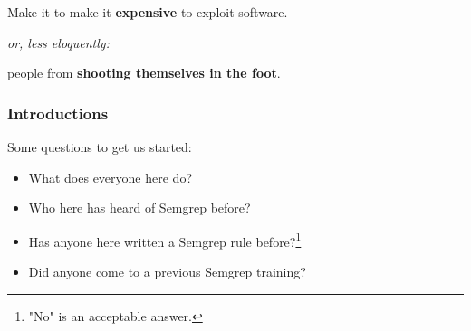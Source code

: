 \documentclass[aspectratio=169, handout]{beamer}
\begin{document}
\begin{frame}[fragile]
  \vspace{\fill}

  \begin{center}
    \Large
    Make it  to make it {\textbf{\color{fgOrange}expensive}} to exploit software.
  \end{center}

  \pause
  \vspace{\fill}

  \begin{center}
    \textit{or, less eloquently:}
  \end{center}

  \pause
  \vspace{\fill}

  \begin{center}
    \Large
     people from {\textbf{\color{fgOrange}shooting themselves in the foot}}.
  \end{center}

  \vspace{\fill}
\end{frame}


\begin{frame}[fragile]
  \frametitle{Introductions}

  Some questions to get us started:

  \pause
  \vspace{5pt}

  \begin{itemize}
    \item What does everyone here do?
    \pause
    \item Who here has heard of Semgrep before?
    \pause
    \item Has anyone here written a Semgrep rule before?\footnote{"No" is an acceptable answer.}
    \pause
    \item Did anyone come to a previous Semgrep training?
  \end{itemize}

\end{frame}

\end{document}
